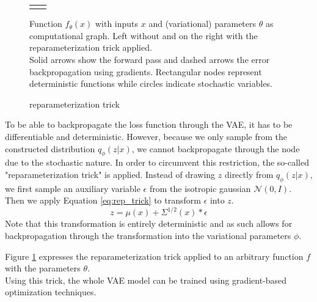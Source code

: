 \begin{figure}
  \centering
  \begin{tabular}{c:c}
      \quad \quad
    &
      \quad

    \\
  \end{tabular}
  \caption{reparameterization trick}
  \label{fig:rep_trick}
  \medskip
  \small
  Function $f_\theta(x)$ with inputs $x$ and (variational) parameters $\theta$ as computational graph.
  Left without and on the right with the reparameterization trick applied.\\
  Solid arrows show the forward pass and dashed arrows the error backpropagation using gradients.
  Rectangular nodes represent deterministic functions while circles indicate stochastic variables.
\end{figure}

To be able to backpropagate the loss function through the VAE, it has to be differentiable and deterministic.
However, because we only sample from the constructed distribution $q_\phi(z|x)$, we cannot backpropagate through the node due to the stochastic nature.
In order to circumvent this restriction, the so-called "reparameterization trick" is applied.
Instead of drawing $z$ directly from $q_\phi(z|x)$, we first sample an auxiliary variable $\epsilon$ from the isotropic gaussian $\mathcal{N}(0, I)$. Then we apply Equation \ref{eq:rep_trick} to transform $\epsilon$ into $z$.
\begin{equation}
  \label{eq:rep_trick}
  z = \mu(x) + \Sigma^{1/2}(x)*\epsilon
\end{equation}
Note that this transformation is entirely deterministic and as such allows for backpropagation through the transformation into the variational parameters $\phi$.

Figure \ref{fig:rep_trick} expresses the reparameterization trick applied to an arbitrary function $f$ with the parameters $\theta$.\\
Using this trick, the whole VAE model can be trained using gradient-based optimization techniques.\\\\

